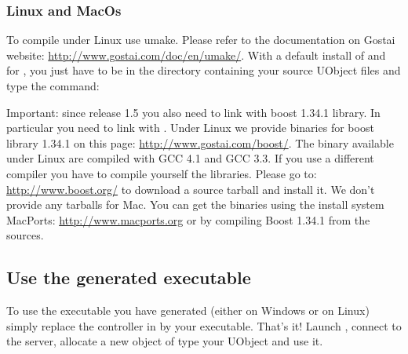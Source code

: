 \subsubsection{Linux and MacOs}

To compile under Linux use umake. Please refer to the documentation on
Gostai website: \url{http://www.gostai.com/doc/en/umake/}.  With a
default install of \webots and \urbi for \webots, you just have to be in
the directory containing your source UObject files and type the
command:


Important: since release 1.5 you also need to link with boost 1.34.1
library.  In particular you need to link with
. Under Linux we provide binaries for boost
library 1.34.1 on this page: \url{http://www.gostai.com/boost/}. The
binary available under Linux are compiled with GCC 4.1 and GCC 3.3. If
you use a different compiler you have to compile yourself the
libraries. Please go to: \url{http://www.boost.org/} to download a
source tarball and install it.  We don't provide any tarballs for
Mac. You can get the binaries using the install system MacPorts:
\url{http://www.macports.org} or by compiling Boost 1.34.1 from the
sources.


\subsection{Use the generated executable}

To use the executable you have generated (either  on
Windows or  on Linux) simply replace the \urbi
controller in  by your
executable. That's it! Launch \webots, connect to the \urbi server,
allocate a new object of type your UObject and use it.
